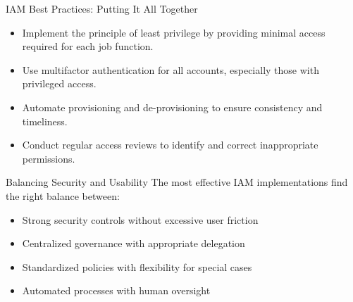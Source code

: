 \documentclass{beamer}
\begin{document}
\begin{frame}{IAM Best Practices: Putting It All Together}
    \begin{itemize}
        \item Implement the principle of least privilege by providing minimal access required for each job function.
        \item Use multifactor authentication for all accounts, especially those with privileged access.
        \item Automate provisioning and de-provisioning to ensure consistency and timeliness.
        \item Conduct regular access reviews to identify and correct inappropriate permissions.
    \end{itemize}
    
    \begin{block}{Balancing Security and Usability}
        The most effective IAM implementations find the right balance between:
        \begin{itemize}
            \item Strong security controls without excessive user friction
            \item Centralized governance with appropriate delegation
            \item Standardized policies with flexibility for special cases
            \item Automated processes with human oversight
        \end{itemize}
    \end{block}
\end{frame}
\end{document}
